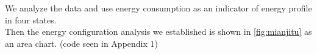 We analyze the data and use energy consumption as an indicator of energy profile in four states.\\
Then the energy configuration analysis we established is shown in \autoref{fig:mianjitu} as an area chart. (code seen in Appendix 1)\\
\begin{figure}[h]
	\centering                                             %
\end{figure}
